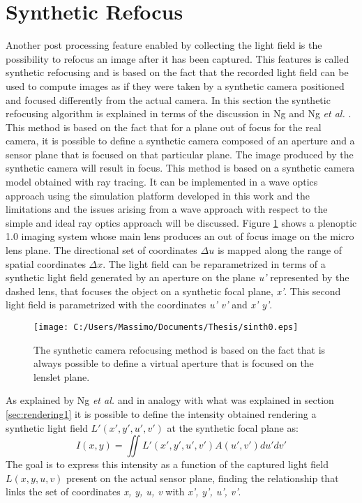  \section{Synthetic Refocus}
 \label{sec:refocus10}
Another post processing feature enabled by collecting the light field is the possibility to refocus an image after it has been captured. This features is called synthetic refocusing and is based on the fact that the recorded light field can be used to compute images as if they were taken by a synthetic camera positioned and focused differently from the actual camera. In this section the synthetic refocusing algorithm is explained in terms of the discussion in Ng \cite{ng2006digital} and Ng \textit{et al.} \cite{ng2005light}. \\
This method is based on the fact that for a plane out of focus for the real camera, it is possible to define a synthetic camera composed of an aperture and a sensor plane that is focused on that particular plane. The image produced by the synthetic camera will result in focus. This method is based on a synthetic camera model obtained with ray tracing. It can be implemented in a wave optics approach using the simulation platform developed in this work and the limitations and the issues arising from a wave approach with respect to the simple and ideal ray optics approach will be discussed. 
 Figure  \ref{fig:synthetic0} shows a plenoptic 1.0 imaging system whose main lens produces an out of focus image on the micro lens plane. The directional set of coordinates $\Delta u$ is mapped along the range of spatial coordinates $\Delta x$. The light field can be reparametrized in terms of a synthetic light field generated by an aperture on the plane \textit{u'} represented by the dashed lens, that focuses the object on a synthetic focal plane, \textit{x'}. This second light field is parametrized with the coordinates \textit{u' v'} and \textit{x' y'}. 
 \newpage
 \begin{figure}[H]
 	\centering
 	\texttt{[image: C:/Users/Massimo/Documents/Thesis/sinth0.eps]}
 	\caption{\label{fig:synthetic0} The synthetic camera refocusing method is based on the fact that is always possible to define a virtual aperture that is focused on the lenslet plane. }
 \end{figure}
 As explained by Ng \textit{et al.} \cite{ng2005light} and in analogy with what was explained in section \ref{sec:rendering1} it is possible to define the intensity obtained rendering a synthetic light field $L'(x',y', u', v') $ at the synthetic focal plane as:
 \begin{equation}
 \label{eq:sinth1}
 I(x,y)=\iint L'(x',y',u',v')A(u',v') du'dv'
 \end{equation}
 The goal is to express this intensity as a function of the captured light field $L(x,y,u,v)$ present on the actual sensor plane, finding the relationship that links the set of coordinates \textit{x, y, u, v} with \textit{x', y', u', v'}. 
 \newpage
